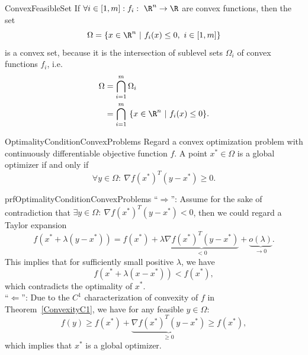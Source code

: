 \begin{ex}{ConvexFeasibleSet}
    If $\forall i \in [1,m]: f_i : \ \R^n \rightarrow \R$ are convex functions, then the set 
    \begin{equation*}
        \Omega = \{x \in \R^n \ | \ f_i(x) \leq 0, \ i \in [1,m]\}
    \end{equation*}
    is a convex set, because it is the intersection of sublevel sets $\Omega_i$ of convex functions $f_i$, i\@.e\@.
    \begin{align*}
        \Omega 
            &= \bigcap_{i=1}^m \Omega_i \\
            &= \bigcap_{i=1}^m \ \{x \in \R^n \ | \ f_i(x) \leq 0 \}.
    \end{align*}
    \vspace{-0.5cm}
\end{ex}


\begin{theo}{OptimalityConditionConvexProblems}
    Regard a convex optimization problem with continuously differentiable objective function $f$. A point $x^* \in \Omega$ is a global optimizer if and only if 
    \begin{equation*}
        \forall y \in \Omega: \ \nabla {f(x^*)}^T(y - x^*) \geq 0.
    \end{equation*} 
    \vspace*{-0.5cm}
\end{theo}

\newpage

\begin{prf}{prfOptimalityConditionConvexProblems}
    ``$\Rightarrow$'': Assume for the sake of contradiction that $\exists y \in \Omega: \ \nabla {f(x^*)}^T(y - x^*) < 0$, then we could regard a Taylor expansion
    \begin{equation*}
        f(x^* + \lambda(y - x^*)) = f(x^*) + \lambda \underbrace{\nabla {f(x^*)}^T(y - x^*)}_{<0} + \underbrace{o(\lambda)}_{\rightarrow 0}.
    \end{equation*}
   This implies that for sufficiently small positive $\lambda$, we have 
   \begin{equation*}
        f(x^* + \lambda(x - x^*)) < f(x^*),
   \end{equation*}
   which contradicts the optimality of $x^*$. \\

    ``$\Leftarrow$'': 
   Due to the $C^1$ characterization of convexity of $f$ in Theorem~\ref{ConvexityC1}, we have for any feasible $y \in \Omega$: 
   \begin{equation*}
       f(y) \geq f(x^*) + \underbrace{\nabla {f(x^*)}^T(y - x^*)}_{\geq 0} \geq f(x^*),
   \end{equation*}
   which implies that $x^*$ is a global optimizer.
\end{prf}  

